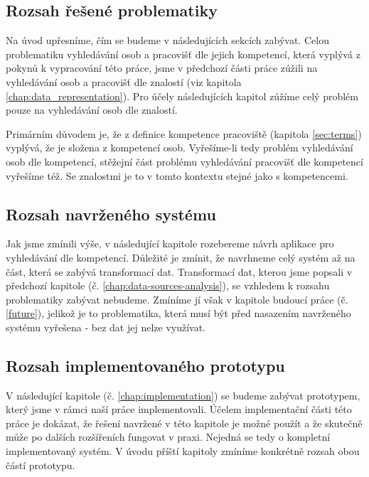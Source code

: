 \subsection{Rozsah řešené problematiky}
Na úvod upřesníme, čím se budeme v následujících sekcích zabývat. Celou problematiku vyhledávání osob a pracovišť dle jejich kompetencí, která vyplývá z pokynů k vypracování této práce, jsme v předchozí části práce zúžili na vyhledávání osob a pracovišť dle znalostí (viz kapitola \ref{chap:data_representation}). Pro účely následujících kapitol zúžíme celý problém pouze na vyhledávání osob dle znalostí.\par
Primárním důvodem je, že z definice kompetence pracoviště (kapitola \ref{sec:terms}) vyplývá, že je složena z kompetencí osob. Vyřešíme-li tedy problém vyhledávání osob dle kompetencí, stěžejní část problému vyhledávání pracovišť dle kompetencí vyřešíme též. Se znalostmi je to v tomto kontextu stejné jako s kompetencemi.\par
\subsection{Rozsah navrženého systému}
Jak jsme zmínili výše, v následující kapitole rozebereme návrh aplikace pro vyhledávání dle kompetencí. Důležité je zmínit, že navrhneme celý systém až na část, která se zabývá transformací dat. Transformací dat, kterou jsme popsali v předchozí kapitole (č. \ref{chap:data-sources-analysis}), se vzhledem k rozsahu problematiky zabývat nebudeme. Zmíníme jí však v kapitole budoucí práce (č. \ref{future}), jelikož je to problematika, která musí být před nasazením navrženého systému vyřešena - bez dat jej nelze využívat.\par
\subsection{Rozsah implementovaného prototypu}
V následující kapitole (č. \ref{chap:implementation}) se budeme zabývat prototypem, který jsme v rámci naší práce implementovali. Účelem implementační části této práce je dokázat, že řešení navržené v této kapitole je možné použít a že skutečně může po dalších rozšířeních fungovat v praxi. Nejedná se tedy o kompletní implementovaný systém. V úvodu příští kapitoly zmíníme konkrétně rozsah obou částí prototypu.


